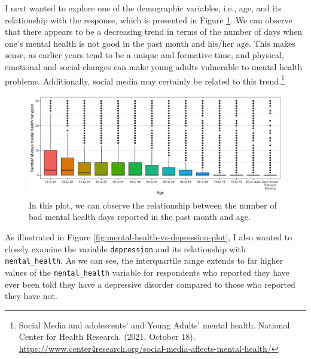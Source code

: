 \documentclass[
]{article}
\begin{document}
I next wanted to explore one of the demographic variables, i.e., age, and its relationship with the response, which is presented in Figure \ref{fig:mental-health-vs-age-plot}. We can observe that there appears to be a decreasing trend in terms of the number of days when one's mental health is not good in the past month and his/her age. This makes sense, as earlier years tend to be a unique and formative time, and physical, emotional and social changes can make young adults vulnerable to mental health problems. Additionally, social media may certainly be related to this trend.\footnote{Social Media and adolescents' and Young Adults' mental health. National Center for Health Research. (2021, October 18). \url{https://www.center4research.org/social-media-affects-mental-health/}}

\begin{figure}[H]

{\centering \includegraphics[width=1\linewidth]{../results/mental-health-vs-age-plot} 

}

\caption{In this plot, we can observe the relationship between the number of bad mental health days reported in the past month and age.}\label{fig:mental-health-vs-age-plot}
\end{figure}

As illustrated in Figure \ref{fig:mental-health-vs-depression-plot}, I also wanted to closely examine the variable \texttt{depression} and its relationship with \texttt{mental\_health}. As we can see, the interquartile range extends to far higher values of the \texttt{mental\_health} variable for respondents who reported they have ever been told they have a depressive disorder compared to those who reported they have not.
\end{document}
